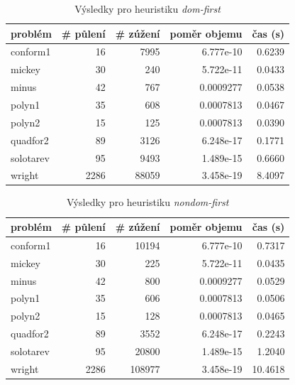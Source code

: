 {\begin{table}[H]
\centering
\begin{tabular}{lrrrr}
\hline
problém & \# půlení & \# zúžení & poměr objemu & čas (s) \\ \hline
conform1 & 16 & 7995 & 6.777e-10 & 0.6239 \\
mickey & 30 & 240 & 5.722e-11 & 0.0433 \\
minus & 42 & 767 & 0.0009277 & 0.0538 \\
polyn1 & 35 & 608 & 0.0007813 & 0.0467 \\
polyn2 & 15 & 125 & 0.0007813 & 0.0390 \\
quadfor2 & 89 & 3126 & 6.248e-17 & 0.1771 \\
solotarev & 95 & 9493 & 1.489e-15 & 0.6660 \\
wright & 2286 & 88059 & 3.458e-19 & 8.4097 \\
\end{tabular}
\caption{Výsledky pro heuristiku \emph{dom-first}}
\label{dom-first}
\end{table}



\begin{table}[H]
\centering
\begin{tabular}{lrrrr}
\hline
problém & \# půlení & \# zúžení & poměr objemu & čas (s) \\ \hline
conform1 & 16 & 10194 & 6.777e-10 & 0.7317 \\
mickey & 30 & 225 & 5.722e-11 & 0.0435 \\
minus & 42 & 800 & 0.0009277 & 0.0529 \\
polyn1 & 35 & 606 & 0.0007813 & 0.0506 \\
polyn2 & 15 & 128 & 0.0007813 & 0.0465 \\
quadfor2 & 89 & 3552 & 6.248e-17 & 0.2243 \\
solotarev & 95 & 20800 & 1.489e-15 & 1.2040 \\
wright & 2286 & 108977 & 3.458e-19 & 10.4618 \\
\end{tabular}
\caption{Výsledky pro heuristiku \emph{nondom-first}}
\label{nondom-first}
\end{table}



}
